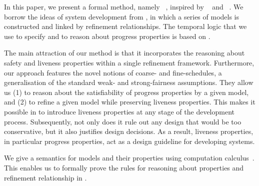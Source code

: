 In this paper, we present a formal method, namely
\unitb~\cite{thesis/hudon2011}, inspired by
\unity~\cite{DBLP:books/daglib/0067338} and
\eventB~\cite{DBLP:books/daglib/0024570}.  We borrow the ideas of
system development from \eventB, in which a series of models is
constructed and linked by refinement relationships.  The temporal
logic that we use to specify and to reason about progress properties
is based on \unity.  

The main attraction of our method is that it
incorporates the reasoning about safety and liveness properties within
a single refinement framework.  Furthermore, our approach features the 
novel notions of coarse- and fine-schedules, a generalisation of the 
standard weak- and strong-fairness assumptions.
They allow us (1) to reason about the satisfiability of
progress properties by a given model, and (2) to refine a given model
while preserving liveness properties.  
This makes it possible in \unitb to introduce liveness properties at any stage of 
the development process. Subsequently, not only does it rule
out any design that would be too conservative, but it also justifies
design decisions.  As a result, liveness properties, in particular
progress properties, act as a design guideline for developing
systems.

We give a semantics for \unitb models and their properties using
computation calculus~\cite{Dijkstra:1998p1128}.  This enables us to
formally prove the rules for reasoning about properties and refinement
relationship in \unitb.



